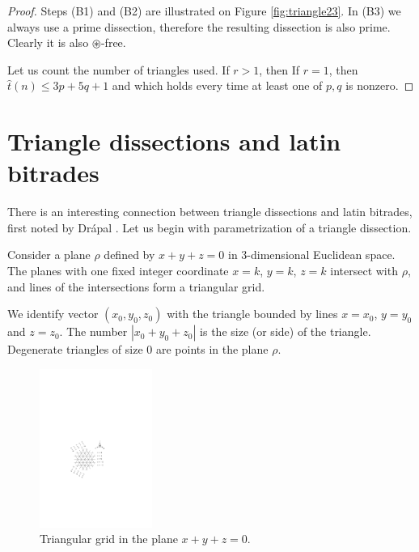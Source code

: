 \begin{proof}
Steps (B1) and (B2) are illustrated on Figure \ref{fig:triangle23}. In (B3) we always use a prime dissection, therefore the resulting dissection is also prime. Clearly it is also $\circledast$-free.

Let us count the number of triangles used. If $r > 1$, then
If $r=1$, then $\hat t(n) \leq 3p + 5q + 1$ and
which holds every time at least one of $p,q$ is nonzero.
\end{proof}

\section{Triangle dissections and latin bitrades}
\label{sec:dissections-and-bitrades}

There is an interesting connection between triangle dissections and latin bitrades, first noted by Drápal \cite{Drapal91}. Let us begin with parametrization of a triangle dissection.

Consider a plane $\rho$ defined by $x+y+z=0$ in 3-dimensional Euclidean space. The planes with one fixed integer coordinate $x=k$, $y=k$, $z=k$ intersect with $\rho$, and lines of the intersections form a triangular grid.

We identify vector $(x_0, y_0, z_0)$ with the triangle bounded by lines $x=x_0$, $y=y_0$ and $z=z_0$. The number $|x_0+y_0+z_0|$ is the size (or side) of the triangle. Degenerate triangles of size 0 are points in the plane $\rho$.

\begin{figure}[htb]
\centering
\includegraphics[height=14em]{img/trigrid.pdf}
\caption{Triangular grid in the plane $x+y+z=0$.}
\label{fig:trigrid}
\end{figure}

